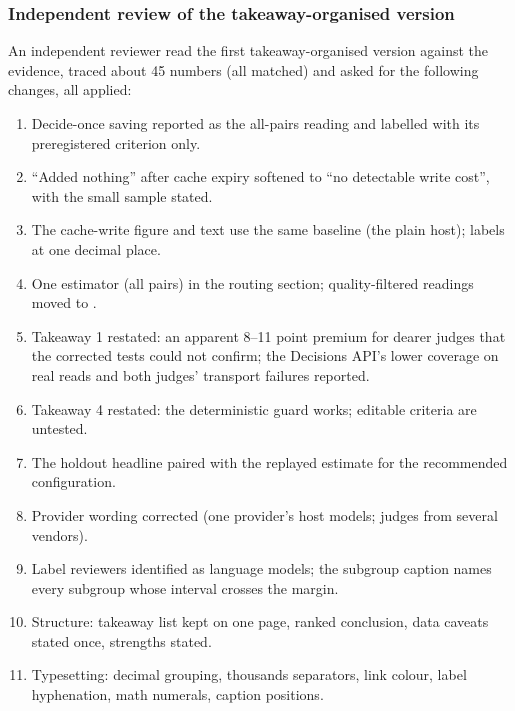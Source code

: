 \subsubsection{Independent review of the takeaway-organised version}
An independent reviewer read the first takeaway-organised version against the evidence, traced about 45 numbers (all
matched) and asked for the following changes, all applied:
\begin{enumerate}[leftmargin=1.6em]
  \item Decide-once saving reported as the all-pairs reading and labelled with its preregistered criterion only.
  \item ``Added nothing'' after cache expiry softened to ``no detectable write cost'', with the small sample stated.
  \item The cache-write figure and text use the same baseline (the plain host); labels at one decimal place.
  \item One estimator (all pairs) in the routing section; quality-filtered readings moved to \thesupp{}.
  \item Takeaway 1 restated: an apparent 8--11 point premium for dearer judges that the corrected tests could not
    confirm; the Decisions API's lower coverage on real reads and both judges' transport failures reported.
  \item Takeaway 4 restated: the deterministic guard works; editable criteria are untested.
  \item The holdout headline paired with the replayed estimate for the recommended configuration.
  \item Provider wording corrected (one provider's host models; judges from several vendors).
  \item Label reviewers identified as language models; the subgroup caption names every subgroup whose interval
    crosses the margin.
  \item Structure: takeaway list kept on one page, ranked conclusion, data caveats stated once, strengths stated.
  \item Typesetting: decimal grouping, thousands separators, link colour, label hyphenation, math numerals, caption
    positions.
\end{enumerate}
